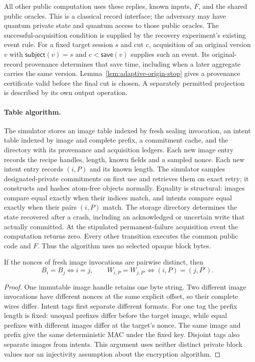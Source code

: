 All other public computation uses these replies, known inputs, $F$, and the
shared public oracles. This is a classical record interface; the adversary
may have quantum private state and quantum access to those public oracles.
The successful-acquisition condition is supplied by the recovery experiment's
existing event rule. For a fixed target session $s$ and cut $c$, acquisition
of an original version $v$ with $\mathsf{subject}(v)=s$ and
$c<\mathsf{save}(v)$ supplies such an event. Its original-record provenance
determines that save time, including when a later aggregate carries the same
version. Lemma~\ref{lem:adaptive-origin-stop} gives a provenance certificate
valid before the final cut is chosen. A separately permitted projection is
described by its own output operation.

\paragraph{Table algorithm.}
The simulator stores an image table indexed by fresh sealing invocation,
an intent table indexed by image and complete prefix, a commitment cache,
and the directory with its provenance and acquisition ledgers. Each new
image entry records the recipe handles, length, known fields and a sampled
nonce. Each new intent entry records $(i,P)$ and its known length. The
simulator samples designated-private commitments on first use and retrieves
them on exact retry; it constructs and hashes atom-free objects normally.
Equality is structural: images compare equal exactly when their indices
match, and intents compare equal exactly when their pairs $(i,P)$ match.
The storage directory determines the state recovered after a crash, including
an acknowledged or uncertain write that actually committed. At the stipulated
permanent-failure acquisition event the computation returns zero. Every other
transition executes the common public code and $F$. Thus the algorithm uses
no selected opaque block bytes.

\begin{lemma}
\label{lem:record-structural-equality}
If the nonces of fresh image invocations are pairwise distinct, then
\[
 B_i=B_j\iff i=j,\qquad
 W_{i,P}=W_{j,P'}\iff(i,P)=(j,P').
\]
\end{lemma}
\begin{proof}
One immutable image handle retains one byte string. Two different image
invocations have different nonces at the same explicit offset, so their
complete wires differ. Intent tags first separate different formats. For
one tag the prefix length is fixed: unequal prefixes differ before the
target image, while equal prefixes with different images differ at the
target's nonce. The same image and prefix give the same deterministic MAC
under the fixed key. Disjoint tags also separate images from intents.
This argument uses neither distinct private block values nor an injectivity
assumption about the encryption algorithm.
\end{proof}

